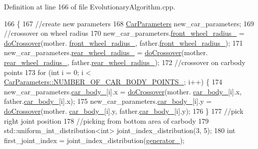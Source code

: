 Definition at line 166 of file Evolutionary\+Algorithm.\+cpp.


\begin{DoxyCode}
166                                                                                                            
            \{
167     \textcolor{comment}{//create new parameters}
168     \hyperlink{classCarParameters}{CarParameters} new\_car\_parameters;
169     \textcolor{comment}{//crossover on wheel radius}
170     new\_car\_parameters.\hyperlink{classCarParameters_ab66832af7618ebe04364630c92850096}{front\_wheel\_radius\_} = \hyperlink{classEvolutionaryAlgorithm_a1f0c3d66b8abfdcdf6eedf065580cef6}{doCrossover}(mother.
      \hyperlink{classCarParameters_ab66832af7618ebe04364630c92850096}{front\_wheel\_radius\_}, father.\hyperlink{classCarParameters_ab66832af7618ebe04364630c92850096}{front\_wheel\_radius\_});
171     new\_car\_parameters.\hyperlink{classCarParameters_a6d3c3fc1c4eef292a7f536da2a089bbd}{rear\_wheel\_radius\_} = \hyperlink{classEvolutionaryAlgorithm_a1f0c3d66b8abfdcdf6eedf065580cef6}{doCrossover}(mother.
      \hyperlink{classCarParameters_a6d3c3fc1c4eef292a7f536da2a089bbd}{rear\_wheel\_radius\_}, father.\hyperlink{classCarParameters_a6d3c3fc1c4eef292a7f536da2a089bbd}{rear\_wheel\_radius\_});
172     \textcolor{comment}{//crossover on carbody points}
173     \textcolor{keywordflow}{for} (\textcolor{keywordtype}{int} i = 0; i < \hyperlink{classCarParameters_a9cd45ac0f506d33d551c86eff1e0fa05}{CarParameters::NUMBER\_OF\_CAR\_BODY\_POINTS\_};
       i++) \{
174         new\_car\_parameters.\hyperlink{classCarParameters_a304345d7fd7771c87421e87785bce810}{car\_body\_}[i].x = \hyperlink{classEvolutionaryAlgorithm_a1f0c3d66b8abfdcdf6eedf065580cef6}{doCrossover}(mother.
      \hyperlink{classCarParameters_a304345d7fd7771c87421e87785bce810}{car\_body\_}[i].x, father.\hyperlink{classCarParameters_a304345d7fd7771c87421e87785bce810}{car\_body\_}[i].x);
175         new\_car\_parameters.\hyperlink{classCarParameters_a304345d7fd7771c87421e87785bce810}{car\_body\_}[i].y = \hyperlink{classEvolutionaryAlgorithm_a1f0c3d66b8abfdcdf6eedf065580cef6}{doCrossover}(mother.
      \hyperlink{classCarParameters_a304345d7fd7771c87421e87785bce810}{car\_body\_}[i].y, father.\hyperlink{classCarParameters_a304345d7fd7771c87421e87785bce810}{car\_body\_}[i].y);
176     \}
177     \textcolor{comment}{//pick right joint position}
178     \textcolor{comment}{//picking from bottom area of carbody}
179     std::uniform\_int\_distribution<int> joint\_index\_distribution(3, 5);
180     \textcolor{keywordtype}{int} first\_joint\_index = joint\_index\_distribution(\hyperlink{classEvolutionaryAlgorithm_adbd823d385ad95bf20496fd2fc25ccde}{generator\_});

\end{DoxyCode}
